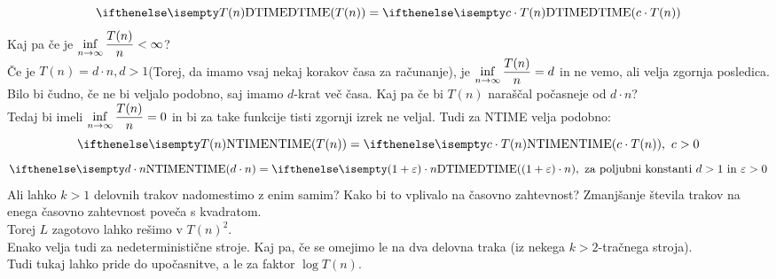 \documentclass[10pt,a4paper,oneside]{book}
\begin{document}
\begin{neurejeno}
{\[ \DTIME{T(n)} = \DTIME{c \cdot T(n)} \]
}
Kaj pa če je $\displaystyle\inf_{n\to\infty} {T(n) \over n} < \infty$?\\
Če je $T(n)=d\cdot n, d>1$(Torej, da imamo vsaj nekaj korakov časa za računanje), je $\displaystyle\inf_{n\to\infty} {T(n) \over n} = d$ in ne vemo, ali velja zgornja posledica. Bilo bi čudno, če ne bi veljalo podobno, saj imamo $d$-krat več časa.
Kaj pa če bi $T(n)$ naraščal počasneje od $d \cdot n$?\\
Tedaj bi imeli $\displaystyle\inf_{n\to\infty} {T(n) \over n} = 0$ %
 in bi za take funkcije tisti zgornji izrek ne veljal.%
\br
Tudi za NTIME velja podobno:
	\[ \NTIME{T(n)} = \NTIME{c\cdot T(n)},\ c>0 \]%
	\[ \NTIME{d \cdot n} = \DTIME{(1+\varepsilon)\cdot n},\mbox{ za poljubni konstanti $d>1$ in $\varepsilon>0$} \]
Ali lahko $k>1$ delovnih trakov nadomestimo z enim samim? Kako bi to vplivalo na časovno zahtevnost?
Zmanjšanje števila trakov na enega časovno zahtevnost poveča s kvadratom.\\
Torej $L$ zagotovo lahko rešimo v $T(n)^2$.\\
Enako velja tudi za nedeterministične stroje.
\br
Kaj pa, če se omejimo le na dva delovna traka (iz nekega $k>2$-tračnega stroja).\\
Tudi tukaj lahko pride do upočasnitve, a le za faktor $\log T(n)$.\\
\end{neurejeno}
\end{document}

